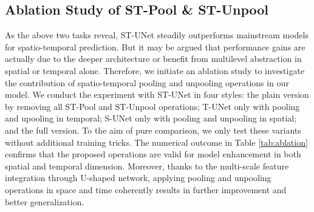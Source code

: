 \documentclass[sigconf,screen]{acmart}
\begin{document}
\subsection{Ablation Study of ST-Pool \& ST-Unpool}
As the above two tasks reveal, ST-UNet steadily outperforms mainstream models for spatio-temporal prediction. But it may be argued that performance gains are actually due to the deeper architecture or benefit from multilevel abstraction in spatial or temporal alone. Therefore, we initiate an ablation study to investigate the contribution of spatio-temporal pooling and unpooling operations in our model. We conduct the experiment with ST-UNet in four styles: the plain version by removing all ST-Pool and ST-Unpool operations; T-UNet only with pooling and upooling in temporal; S-UNet only with pooling and unpooling in spatial; and the full version. To the aim of pure comparison, we only test these variants without additional training tricks. The numerical outcome in Table \ref{tab:ablation} confirms that the proposed operations are valid for model enhancement in both spatial and temporal dimension. Moreover, thanks to the multi-scale feature integration through U-shaped network, applying pooling and unpooling operations in space and time coherently results in further improvement and better generalization. 

\begin{table}
\centering
\caption{\label{tab:ablation}Comparison of ST-UNet variants with or without ST-Pool \& ST-Unpool operations in terms of prediction accuracy on PeMS-M.}
\end{table}
\end{document}
